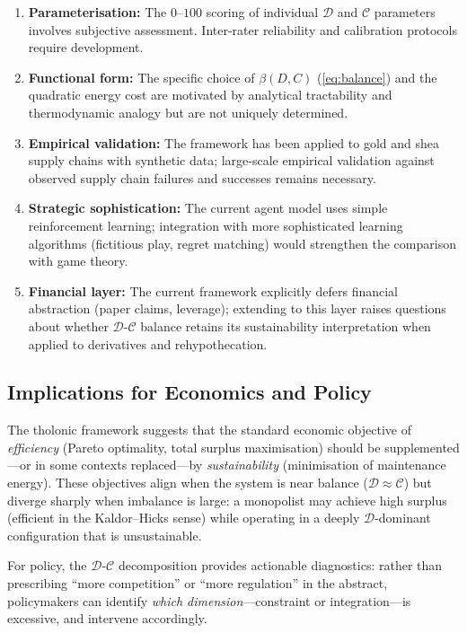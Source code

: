 \documentclass[12pt,a4paper,twocolumn]{article}
\newcommand{\D}{\mathcal{D}}
\newcommand{\CC}{\mathcal{C}}
\begin{document}
\begin{enumerate}[nosep,label=(\roman*)]
  \item \textbf{Parameterisation:} The $0$--$100$ scoring of individual $\D$ and $\CC$ parameters involves subjective assessment.
  Inter-rater reliability and calibration protocols require development.
  \item \textbf{Functional form:} The specific choice of $\beta(D,C)$ (\cref{eq:balance}) and the quadratic energy cost are motivated by analytical tractability and thermodynamic analogy but are not uniquely determined.
  \item \textbf{Empirical validation:} The framework has been applied to gold and shea supply chains with synthetic data; large-scale empirical validation against observed supply chain failures and successes remains necessary.
  \item \textbf{Strategic sophistication:} The current agent model uses simple reinforcement learning; integration with more sophisticated learning algorithms (fictitious play, regret matching) would strengthen the comparison with game theory.
  \item \textbf{Financial layer:} The current framework explicitly defers financial abstraction (paper claims, leverage); extending to this layer raises questions about whether $\D$-$\CC$ balance retains its sustainability interpretation when applied to derivatives and rehypothecation.
\end{enumerate}

\subsection{Implications for Economics and Policy}

The tholonic framework suggests that the standard economic objective of \emph{efficiency} (Pareto optimality, total surplus maximisation) should be supplemented---or in some contexts replaced---by \emph{sustainability} (minimisation of maintenance energy).
These objectives align when the system is near balance ($\D \approx \CC$) but diverge sharply when imbalance is large: a monopolist may achieve high surplus (efficient in the Kaldor--Hicks sense) while operating in a deeply $\D$-dominant configuration that is unsustainable.

For policy, the $\D$-$\CC$ decomposition provides actionable diagnostics: rather than prescribing ``more competition'' or ``more regulation'' in the abstract, policymakers can identify \emph{which dimension}---constraint or integration---is excessive, and intervene accordingly.
\end{document}
